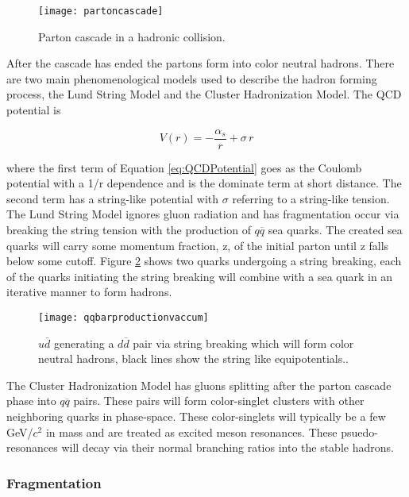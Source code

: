 \begin{figure}[h]
\texttt{[image: partoncascade]}
\centering
\caption{Parton cascade in a hadronic collision\cite{Webber:1994zd}.}
\label{fig:pcascade}
\end{figure}

\noindent
After the cascade has ended the partons form into color neutral hadrons.  There are two main phenomenological models used to describe the hadron forming process, the Lund String Model and the Cluster Hadronization Model.  The QCD potential is

\begin{equation}
V(r) = - \frac{\alpha_{s}}{r} + \sigma \, r
\label{eq:QCDPotential}
\end{equation}

\noindent
where the first term of Equation \ref{eq:QCDPotential} goes as the Coulomb potential with a 1/r dependence and is the dominate term at short distance.  The second term has a string-like potential with $\sigma$ referring to a string-like tension.  The Lund String Model ignores gluon radiation and has fragmentation occur via breaking the string tension with the production of $q\overline{q}$ sea quarks.  The created sea quarks will carry some momentum fraction, z, of the initial parton until z falls below some cutoff.  Figure \ref{fig:qqbarstring} shows two quarks undergoing a string breaking, each of the quarks initiating the string breaking will combine with a sea quark in an iterative manner to form hadrons.  


\begin{figure}[h]
\texttt{[image: qqbarproductionvaccum]}
\centering
\caption{$u \overline{d}$ generating a $d \overline{d}$ pair via string breaking which will form color neutral hadrons, black lines show the string like equipotentials.\cite{Andersson:2002ap}.}
\label{fig:qqbarstring}
\end{figure}

The Cluster Hadronization Model has gluons splitting after the parton cascade phase into $q\overline{q}$ pairs.  These pairs will form color-singlet clusters with other neighboring quarks in phase-space.  These color-singlets will typically be a few GeV/\textit{$c^{2}$} in mass and are treated as excited meson resonances.  These psuedo-resonances will decay via their normal branching ratios into the stable hadrons\cite{Webber:1983if}.

\subsubsection{Fragmentation}

